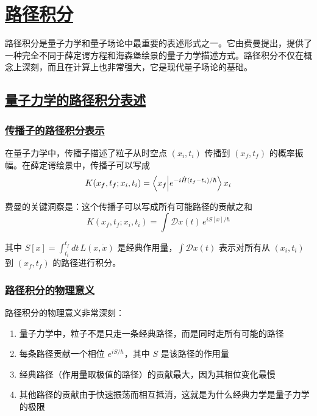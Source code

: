 \chapter{\protect\hyperlink{:}{路径积分}}

路径积分是量子力学和量子场论中最重要的表述形式之一。它由费曼提出，提供了一种完全不同于薛定谔方程和海森堡绘景的量子力学描述方式。路径积分不仅在概念上深刻，而且在计算上也非常强大，它是现代量子场论的基础。

\section{\protect\hyperlink{:}{量子力学的路径积分表述}}

\subsection{\protect\hyperlink{:}{传播子的路径积分表示}}

在量子力学中，传播子描述了粒子从时空点 $(x_i, t_i)$ 传播到 $(x_f, t_f)$ 的概率振幅。在薛定谔绘景中，传播子可以写成
\begin{equation}
    K(x_f, t_f; x_i, t_i) = \braket{x_f}{e^{-i\hat{H}(t_f-t_i)/\hbar}}{x_i}
\end{equation}

费曼的关键洞察是：这个传播子可以写成所有可能路径的贡献之和
\begin{equation}
    K(x_f, t_f; x_i, t_i) = \int \mathcal{D}x(t) \, e^{iS[x]/\hbar}
\end{equation}

其中 $S[x] = \int_{t_i}^{t_f} dt \, L(x, \dot{x})$ 是经典作用量，$\int \mathcal{D}x(t)$ 表示对所有从 $(x_i, t_i)$ 到 $(x_f, t_f)$ 的路径进行积分。

\subsection{\protect\hyperlink{:}{路径积分的物理意义}}

路径积分的物理意义非常深刻：
\begin{enumerate}
    \item 量子力学中，粒子不是只走一条经典路径，而是同时走所有可能的路径
    \item 每条路径贡献一个相位 $e^{iS/\hbar}$，其中 $S$ 是该路径的作用量
    \item 经典路径（作用量取极值的路径）的贡献最大，因为其相位变化最慢
    \item 其他路径的贡献由于快速振荡而相互抵消，这就是为什么经典力学是量子力学的极限
\end{enumerate}

